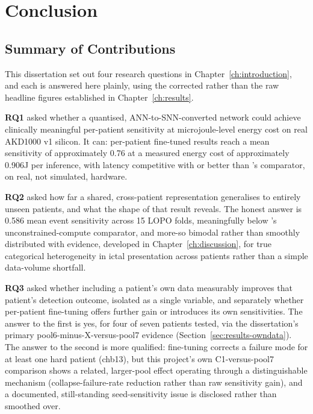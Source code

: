 \chapter{Conclusion}
\label{ch:conclusion}

\section{Summary of Contributions}

This dissertation set out four research questions in Chapter~\ref{ch:introduction}, and each is answered here plainly, using the corrected rather than the raw headline figures established in Chapter~\ref{ch:results}.

\textbf{RQ1} asked whether a quantised, ANN-to-SNN-converted network could achieve clinically meaningful per-patient sensitivity at microjoule-level energy cost on real AKD1000 v1 silicon. It can: per-patient fine-tuned results reach a mean sensitivity of approximately 0.76 at a measured energy cost of approximately 0.906\textmu J per inference, with latency competitive with or better than \citet{shoeb2009}'s comparator, on real, not simulated, hardware.

\textbf{RQ2} asked how far a shared, cross-patient representation generalises to entirely unseen patients, and what the shape of that result reveals. The honest answer is 0.586 mean event sensitivity across 15 LOPO folds, meaningfully below \citet{ali2024}'s unconstrained-compute comparator, and more-so bimodal rather than smoothly distributed with evidence, developed in Chapter~\ref{ch:discussion}, for true categorical heterogeneity in ictal presentation across patients rather than a simple data-volume shortfall.

\textbf{RQ3} asked whether including a patient's own data measurably improves that patient's detection outcome, isolated as a single variable, and separately whether per-patient fine-tuning offers further gain or introduces its own sensitivities. The answer to the first is yes, for four of seven patients tested, via the dissertation's primary pool6-minus-X-versus-pool7 evidence (Section~\ref{sec:results-owndata}). The answer to the second is more qualified: fine-tuning corrects a failure mode for at least one hard patient (chb13), but this project's own C1-versus-pool7 comparison shows a related, larger-pool effect operating through a distinguishable mechanism (collapse-failure-rate reduction rather than raw sensitivity gain), and a documented, still-standing seed-sensitivity issue is disclosed rather than smoothed over.

